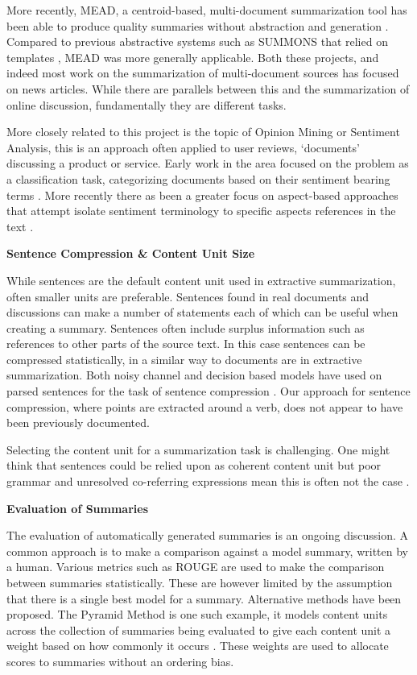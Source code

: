         More recently, MEAD, a centroid-based, multi-document summarization tool has been able to produce quality summaries without abstraction and generation \cite{radev2000centroid}. Compared to previous abstractive systems such as SUMMONS that relied on templates \cite{mckeown1995generating}, MEAD was more generally applicable. Both these projects, and indeed most work on the summarization of multi-document sources has focused on news articles. While there are parallels between this and the summarization of online discussion, fundamentally they are different tasks.

        More closely related to this project is the topic of Opinion Mining or Sentiment Analysis, this is an approach often applied to user reviews, `documents' discussing a product or service. Early work in the area focused on the problem as a classification task, categorizing documents based on their sentiment bearing terms \cite{turney2002thumbs}. More recently there as been a greater focus on aspect-based approaches that attempt isolate sentiment terminology to specific aspects references in the text \cite{hu2004mining}.

      \noindent\textbf{Sentence Compression \& Content Unit Size}

        \noindent While sentences are the default content unit used in extractive summarization, often smaller units are preferable. Sentences found in real documents and discussions can make a number of statements each of which can be useful when creating a summary. Sentences often include surplus information such as references to other parts of the source text. In this case sentences can be compressed statistically, in a similar way to documents are in extractive summarization. Both noisy channel and decision based models have used on parsed sentences for the task of sentence compression \cite{knight2000statistics}. Our approach for sentence compression, where points are extracted around a verb, does not appear to have been previously documented.

        Selecting the content unit for a summarization task is challenging. One might think that sentences could be relied upon as coherent content unit but poor grammar and unresolved co-referring expressions mean this is often not the case \cite{witbrock1999ultra}.

      \noindent\textbf{Evaluation of Summaries}

        \noindent The evaluation of automatically generated summaries is an ongoing discussion. A common approach is to make a comparison against a model summary, written by a human. Various metrics such as ROUGE \cite{lin2004rouge} are used to make the comparison between summaries statistically. These are however limited by the assumption that there is a single best model for a summary. Alternative methods have been proposed. The Pyramid Method is one such example, it models content units across the collection of summaries being evaluated to give each content unit a weight based on how commonly it occurs \cite{nenkova2004evaluating}. These weights are used to allocate scores to summaries without an ordering bias.

